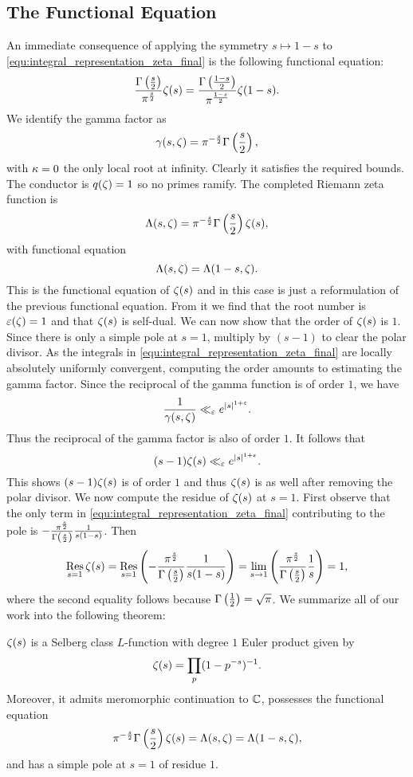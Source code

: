     \subsection*{The Functional Equation}
      An immediate consequence of applying the symmetry $s \mapsto 1-s$ to \cref{equ:integral_representation_zeta_final} is the following functional equation:
      \[
        \frac{\Gamma\left(\frac{s}{2}\right)}{\pi^{\frac{s}{2}}}\zeta(s) = \frac{\Gamma\left(\frac{1-s}{2}\right)}{\pi^{\frac{1-s}{2}}}\zeta(1-s).
      \]
      We identify the gamma factor as
      \[
        \gamma(s,\zeta) = \pi^{-\frac{s}{2}}\Gamma\left(\frac{s}{2}\right),
      \]
      with $\kappa = 0$ the only local root at infinity. Clearly it satisfies the required bounds. The conductor is $q(\zeta) = 1$ so no primes ramify. The completed Riemann zeta function is
      \[
        \Lambda(s,\zeta) = \pi^{-\frac{s}{2}}\Gamma\left(\frac{s}{2}\right)\zeta(s),
      \]
      with functional equation
      \[
        \Lambda(s,\zeta) = \Lambda(1-s,\zeta).
      \]
      This is the functional equation of $\zeta(s)$ and in this case is just a reformulation of the previous functional equation. From it we find that the root number is $\varepsilon(\zeta) = 1$ and that $\zeta(s)$ is self-dual. We can now show that the order of $\zeta(s)$ is $1$. Since there is only a simple pole at $s = 1$, multiply by $(s-1)$ to clear the polar divisor. As the integrals in \cref{equ:integral_representation_zeta_final} are locally absolutely uniformly convergent, computing the order amounts to estimating the gamma factor. Since the reciprocal of the gamma function is of order $1$, we have
      \[
        \frac{1}{\gamma(s,\zeta)} \ll_{\varepsilon} e^{|s|^{1+\varepsilon}}.
      \]
      Thus the reciprocal of the gamma factor is also of order $1$. It follows that
      \[
        (s-1)\zeta(s) \ll_{\varepsilon} e^{|s|^{1+\varepsilon}}.
      \]
      This shows $(s-1)\zeta(s)$ is of order $1$ and thus $\zeta(s)$ is as well after removing the polar divisor. We now compute the residue of $\zeta(s)$ at $s = 1$. First observe that the only term in \cref{equ:integral_representation_zeta_final} contributing to the pole is $-\frac{\pi^{\frac{s}{2}}}{\Gamma\left(\frac{s}{2}\right)}\frac{1}{s(1-s)}$. Then
      \[
        \operatorname*{\mathrm{Res}}_{s = 1}\zeta(s) = \operatorname*{\mathrm{Res}}_{s = 1}\left(-\frac{\pi^{\frac{s}{2}}}{\Gamma\left(\frac{s}{2}\right)}\frac{1}{s(1-s)}\right) = \lim_{s \to 1}\left(\frac{\pi^{\frac{s}{2}}}{\Gamma\left(\frac{s}{2}\right)}\frac{1}{s}\right) = 1,
      \]
      where the second equality follows because $\Gamma\left(\frac{1}{2}\right) = \sqrt{\pi}$. We summarize all of our work into the following theorem:

      \begin{theorem}\label{thm:zeta_Selberg}
        $\zeta(s)$ is a Selberg class $L$-function with degree $1$ Euler product given by
        \[
          \zeta(s) = \prod_{p}(1-p^{-s})^{-1}.
        \]
        Moreover, it admits meromorphic continuation to $\mathbb{C}$, possesses the functional equation
        \[
          \pi^{-\frac{s}{2}}\Gamma\left(\frac{s}{2}\right)\zeta(s) = \Lambda(s,\zeta) = \Lambda(1-s,\zeta),
        \]
        and has a simple pole at $s = 1$ of residue $1$.
      \end{theorem}

